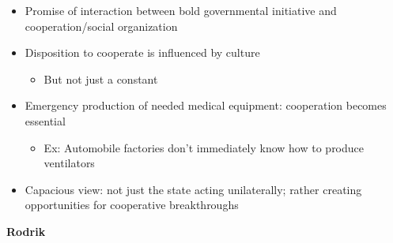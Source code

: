 \begin{itemize}
\tightlist
\item
  Promise of interaction between bold governmental initiative and
  cooperation/social organization
\item
  Disposition to cooperate is influenced by culture

  \begin{itemize}
  \tightlist
  \item
    But not just a constant
  \end{itemize}
\item
  Emergency production of needed medical equipment: cooperation becomes
  essential

  \begin{itemize}
  \tightlist
  \item
    Ex: Automobile factories don't immediately know how to produce
    ventilators
  \end{itemize}
\item
  Capacious view: not just the state acting unilaterally; rather
  creating opportunities for cooperative breakthroughs
\end{itemize}

\textbf{Rodrik}

